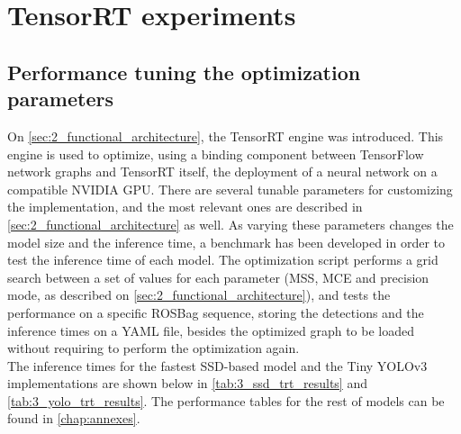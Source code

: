 \section{TensorRT experiments}

\subsection{Performance tuning the optimization parameters}

\label{sec:3_grid_trt}
On \autoref{sec:2_functional_architecture}, the TensorRT engine was introduced. This engine is used to optimize, using a binding component between TensorFlow network graphs and TensorRT itself, the deployment of a neural network on a compatible NVIDIA GPU. There are several tunable parameters for customizing the implementation, and the most relevant ones are described in \autoref{sec:2_functional_architecture} as well. As varying these parameters changes the model size and the inference time, a benchmark has been developed in order to test the inference time of each model. The optimization script performs a grid search between a set of values for each parameter (MSS, MCE and precision mode, as described on \autoref{sec:2_functional_architecture}), and tests the performance on a specific ROSBag sequence, storing the detections and the inference times on a YAML file, besides the optimized graph to be loaded without requiring to perform the optimization again.\\

The inference times for the fastest SSD-based model and the Tiny YOLOv3 implementations are shown below in \autoref{tab:3_ssd_trt_results} and \autoref{tab:3_yolo_trt_results}. The performance tables for the rest of models can be found in \autoref{chap:annexes}.


